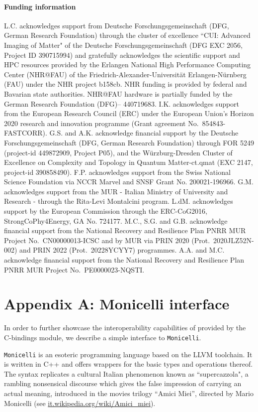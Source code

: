 \documentclass[edipack_sp.tex]{subfiles}
\begin{document}
\paragraph{Funding information}
L.C. acknowledges support from Deutsche Forschungsgemeinschaft (DFG, German Research Foundation) thr\-ough the cluster of excellence ``CUI: Advanced Imaging of Matter" of the Deutsche Forschungsgemeinschaft (DFG EXC 2056, Project ID 390715994) and gratefully acknowledges the scientific support and HPC resources provided by the Erlangen National High Performance Computing Center (NHR@FAU) of the Friedrich-Alexander-Universität Erlangen-Nürnberg (FAU) under the NHR project b158cb. NHR funding is provided by federal and Bavarian state authorities. NHR@FAU hardware is partially funded by the German Research Foundation (DFG)– 440719683.
I.K. acknowledges support from the European Research Council (ERC) under the European Union's Horizon 2020 research and innovation programme (Grant agreement No.~854843-FASTCORR).
G.S. and A.K. acknowledge financial support by the Deutsche Forschungsgemeinschaft (DFG, German Research Foundation) through FOR 5249 (project-id 449872909, Project P05), and the W\"urzburg-Dresden Cluster of Excellence on Complexity and Topology in Quantum Matter-ct.qmat (EXC 2147, project-id 390858490).
F.P. acknowledges support from the Swiss National Science Foundation via NCCR Marvel and SNSF Grant No. 200021-196966.
G.M. acknowledges support from the MUR - Italian Ministry of University and Research - through the Rita-Levi Montalcini program.
L.dM. acknowledges support by the European Commission through the ERC-CoG2016, StrongCoPhy4Energy, GA No. 724177.
M.C., S.G. and G.B. acknowledge financial support from the National Recovery and Resilience Plan PNRR
MUR Project No.~CN00000013-ICSC and by MUR via PRIN 2020 (Prot.~2020JLZ52N-002) and PRIN 2022 (Prot.~20228YCYY7) programmes.
A.A. and M.C. acknowledge financial support from the National Recovery and Resilience Plan PNRR MUR Project No.~PE0000023-NQSTI. 




\section{Appendix A: Monicelli interface}\label{appendixA}
In order to further showcase the interoperability capabilities of
\NAME provided by the C-bindings module, we describe a simple interface to {\tt Monicelli}.

  
{\tt Monicelli} is an esoteric programming language based on the LLVM
toolchain.
It is written in C++ and offers wrappers for the basic
types and operations thereof. The syntax replicates a cultural Italian
phenomenon known as ``supercazzola", a rambling nonsensical discourse
which gives the false impression of carrying an actual meaning,
introduced in the movies trilogy ``Amici Miei'', directed by Mario
Monicelli (see \href{https://it.wikipedia.org/wiki/Amici_miei}{it.wikipedia.org/wiki/Amici\-\_\-miei}). 
\end{document}
